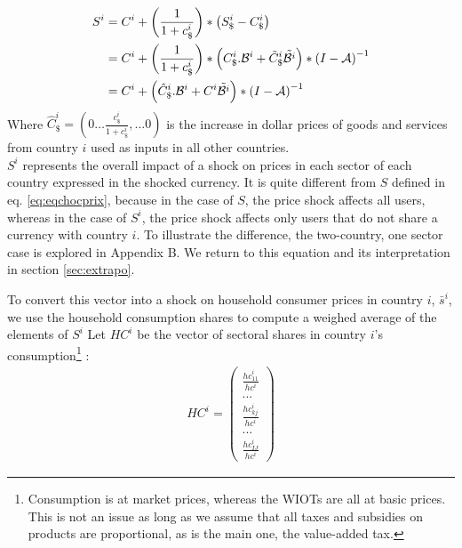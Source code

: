 \documentclass[11pt,a4paper]{article}
\begin{document}
\begin{equation}
\begin{aligned}
	S^i&=C^i  + \left( \frac{1}{1+{{c}_\$^i}}\right)*\left({S_\$^i}-{{C}_{\$}^i}\right)\\
	&=C^i + \left( \frac{1}{1+{{c}_\$^i}}\right)*\left(C_\$^i.{\cal B}^i+{\tilde{C}_\$^i}{\tilde{{\cal B}^i}}\right)*{{(I-{\cal A})}^{-1}} 	\\
	&=C^i	+ \left(\hat{C}^i_\$.{\cal B}^i+{C^i}{\tilde{{\cal B}^i}}\right)*{{(I-{\cal A})}^{-1}}	
\label{eq:eqdomcurrency}
\end{aligned}
\end{equation}
Where $\hat{C}^i_\$=\left(0 \ldots \frac{c_\$^i}{1+c_\$^i},\ldots 0 \right)$ is the increase in dollar prices of goods and services from country $i$ used as inputs in all other countries.\\ 
$S^i$ represents the overall impact of a shock on prices in each sector of each country expressed in the shocked currency.
It is quite different from $S$ defined in eq. \eqref{eq:eqchocprix}, because in the case of $S$, the price shock affects all users, whereas in the case of $S^i$, the price shock affects only users that do not share a currency with country $i$. 
To illustrate the difference, the two-country, one sector case is explored in Appendix B. We return to this equation and its interpretation in section  \ref{sec:extrapo}.

To convert this vector into a shock on household consumer prices in country $i$, $\bar{s}^i$, we use the household consumption shares to compute a weighed average of the elements of $S^i$
Let $HC^i$ be the vector of sectoral shares in country $i$'s consumption\footnote{Consumption is at market prices, whereas the WIOTs are all at basic prices. This is not an issue as long as we assume that all taxes and subsidies on products are proportional, as is the main one, the value-added tax.} :
\begin{eqnarray*}
HC^i=\left( 
	\begin{array}{c}
	\frac{{hc}_{11}^i}{hc^i} \\
	...\\
	\frac{{hc}_{kj}^i}{hc^i}\\
	...\\
	\frac{{hc}_{IJ}^i}{hc^i}
	 \end{array}
	 \right)
\end{eqnarray*}
\end{document}

